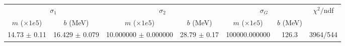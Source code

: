 \begin{tabular}{cc|cc|cc||c}
\multicolumn{2}{c|}{$\sigma_1$} & \multicolumn{2}{|c}{$\sigma_2$} & \multicolumn{2}{|c}{$\sigma_G$}  & \multirow{2}{*}{$\chi^2/$ndf}\\
$m$ ($\times1e5$) & $b$ (MeV) & $m$ ($\times1e5$) & $b$ (MeV) & $m$ ($\times1e5$) & $b$ (MeV) & \\
\hline
14.73 $\pm$ 0.11 & 16.429 $\pm$ 0.079 & 10.000000 $\pm$ 0.000000 & 28.79 $\pm$ 0.17 & 100000.000000 & 126.3 & 3964/544\\
\end{tabular}
